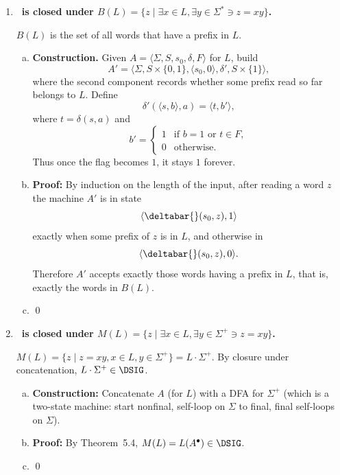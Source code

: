 \begin{enumerate}[{5.}1. ]
\item \textbf{\DSIG\ is closed under $B(L)=\{z\mid\exists x\in L,\exists y\in\Sigma^*\ni z=xy\}$.}

$B(L)$ is the set of all words that have a prefix in $L$.

\begin{enumerate}[(a)]
  \item \textbf{Construction.}  Given
  $A=\langle\Sigma,S,s_0,\delta,F\rangle$ for $L$, build
  \[
  A'=\langle\Sigma,S\times\{0,1\},\langle s_0,0\rangle,\delta',S\times\{1\}\rangle,
  \]
  where the second component records whether some prefix read so far belongs to
  $L$.  Define
  \[
  \delta'(\langle s,b\rangle,a)=\langle t,b'\rangle,
  \]
  where $t=\delta(s,a)$ and
  \[
  b'=
  \begin{cases}
  1 & \text{if } b=1 \text{ or } t\in F,\\
  0 & \text{otherwise.}
  \end{cases}
  \]
  Thus once the flag becomes $1$, it stays $1$ forever.

  \item \textbf{Proof:}  By induction on the length of the input, after reading a
  word $z$ the machine $A'$ is in state
  \[
  \langle \deltabar{}(s_0,z), 1\rangle
  \]
  exactly when some prefix of $z$ is in $L$, and otherwise in
  \[
  \langle \deltabar{}(s_0,z), 0\rangle.
  \]
  Therefore $A'$ accepts exactly those words having a prefix in $L$, that is,
  exactly the words in $B(L)$.

  \item \qed
\end{enumerate}

\item \textbf{\DSIG\ is closed under $M(L)=\{z\mid\exists x\in L,\exists y\in\Sigma^+\ni z=xy\}$.}

$M(L)=\{z\mid z=xy,x\in L,y\in\Sigma^+\}=L\cdot\Sigma^+$.  By closure under concatenation, $L\cdot\Sigma^+\in\DSIG$.

\begin{enumerate}[(a)]
  \item \textbf{Construction:} Concatenate $A$ (for $L$) with a DFA for $\Sigma^+$ (which is a two-state machine: start nonfinal, self-loop on $\Sigma$ to final, final self-loops on $\Sigma$).
  \item \textbf{Proof:} By Theorem~5.4, $M(L)=L(A^\bullet)\in\DSIG$.
  \item \qed
\end{enumerate}


\end{enumerate}
